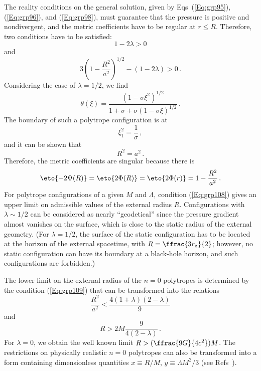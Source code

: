 The reality conditions on the general solution, given by Eqs~(\ref{Eq:grp95}),
(\ref{Eq:grp96}), and (\ref{Eq:grp98}), must guarantee that the pressure is
positive and nondivergent, and the metric coefficients have to be regular at
$r \leq R$.  Therefore, two conditions have to be satisfied:
\begin{equation}
  1-2\lambda > 0                                          \label{Eq:grp108}
\end{equation}
and
\begin{equation}
  3\left(1-\frac{R^{2}}{a^{2}}\right)^{\!\!1/2}
   - (1-2\lambda) > 0\,.                                  \label{Eq:grp109}
\end{equation}
Considering the case of $\lambda = 1/2$, we find
\begin{equation}
  \theta(\xi) = \frac{(1-\sigma\xi^{2})^{1/2}}%
                {1+\sigma + \sigma(1-\sigma\xi)^{1/2}}\,. \label{Eq:grp110}
\end{equation}
The boundary of such a polytrope configuration is at
\begin{equation}
  \xi_{1}^{2} = \frac{1}{\sigma}\,,                       \label{Eq:grp111}
\end{equation}
and it can be shown that
\begin{equation}
  R^{2} = a^{2}\,.                                        \label{Eq:grp112}
\end{equation}
Therefore, the metric coefficients are singular because there is
\begin{equation}
  \eto{-2\Psi(R)} = \eto{2\Phi(R)} = \eto{2\Phi(r)}
                 = 1-\frac{R^{2}}{a^{2}}\,.               \label{Eq:grp113}
\end{equation}
For polytrope configurations of a given $M$ and $\Lambda$, condition
(\ref{Eq:grp108}) gives an upper limit on admissible values of the external
radius $R$. Configurations with \mbox{$\lambda \sim 1/2$} can be considered as
nearly ``geodetical'' since the pressure gradient almost vanishes on the
surface, which is close to the static radius of the external geometry. (For
$\lambda = 1/2$, the surface of the static configuration has to be located at
the horizon of the external spacetime, with $R=\ffrac{3r_{\mathrm{g}}}{2}$;
however, no static configuration can have its boundary at a \mbox{black-hole}
horizon, and such configurations are forbidden.)

The lower limit on the external radius of the $n=0$ polytropes is determined
by the condition (\ref{Eq:grp109}) that can be transformed into the relations
\begin{equation}
  \frac{R^{2}}{a^{2}} < \frac{4(1+\lambda)(2-\lambda)}{9} \label{Eq:grp114}
\end{equation}
and
\begin{equation}
  R > 2M\frac{9}{4(2-\lambda)}\,.                         \label{Eq:grp115}
\end{equation}
For $\lambda = 0$, we obtain the well known limit $R>
(\ffrac{9G}{4c^{2}})M$. The restrictions on physically realistic $n=0$
polytropes can also be transformed into a form containing dimensionless
quantities $x \equiv R/M$, $y \equiv \Lambda M^{2}/3$ (see
Refs~\cite{Stu:2000:ACTPS2:,%
  Stu-etal:2001:PHYSR4:}).

